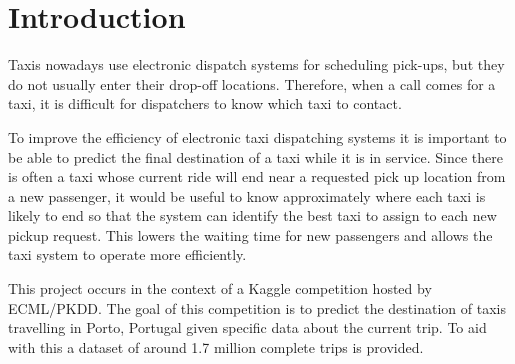 \documentclass[12pt]{article}
\begin{document}
\maketitle

\section{Introduction}
Taxis nowadays use electronic dispatch systems for scheduling pick-ups, but they do not usually enter their drop-off locations. Therefore, when a call comes for a taxi, it is difficult for dispatchers to know which taxi to contact. 

To improve the efficiency of electronic taxi dispatching systems it is important to be able to predict the final destination of a taxi while it is in service. Since there is often a taxi whose current ride will end near a requested pick up location from a new passenger, it would be useful to know approximately where each taxi is likely to end so that the system can identify the best taxi to assign to each new pickup request. This lowers the waiting time for new passengers and allows the taxi system to operate more efficiently.

This project occurs in the context of a Kaggle competition hosted by ECML/PKDD. The goal of this competition is to predict the destination of taxis travelling in Porto, Portugal given specific data about the current trip. To aid with this a dataset of around 1.7 million complete trips is provided.
\end{document}
